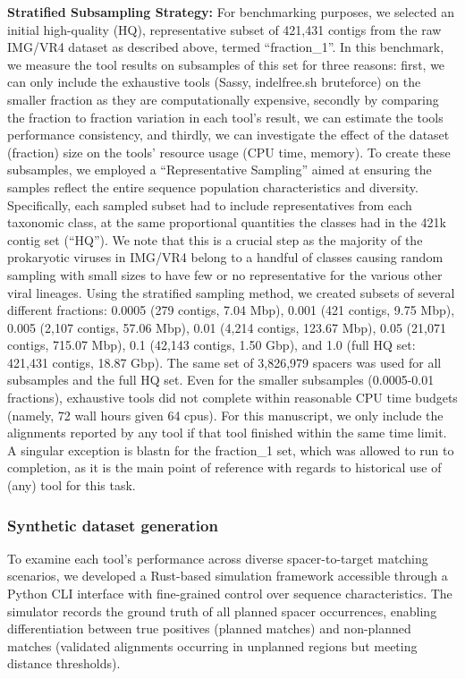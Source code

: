 \documentclass[
]{article}
\begin{document}
\textbf{Stratified Subsampling Strategy:} For benchmarking purposes, we
selected an initial high-quality (HQ), representative subset of 421,431
contigs from the raw IMG/VR4 dataset as described above, termed
``fraction\_1''. In this benchmark, we measure the tool results on
subsamples of this set for three reasons: first, we can only include the
exhaustive tools (Sassy, indelfree.sh bruteforce) on the smaller
fraction as they are computationally expensive, secondly by comparing
the fraction to fraction variation in each tool's result, we can
estimate the tools performance consistency, and thirdly, we can
investigate the effect of the dataset (fraction) size on the tools'
resource usage (CPU time, memory). To create these subsamples, we
employed a ``Representative Sampling'' aimed at ensuring the samples
reflect the entire sequence population characteristics and diversity.
Specifically, each sampled subset had to include representatives from
each taxonomic class, at the same proportional quantities the classes
had in the 421k contig set (``HQ''). We note that this is a crucial step
as the majority of the prokaryotic viruses in IMG/VR4 belong to a
handful of classes causing random sampling with small sizes to have few
or no representative for the various other viral lineages. Using the
stratified sampling method, we created subsets of several different
fractions: 0.0005 (279 contigs, 7.04 Mbp), 0.001 (421 contigs, 9.75
Mbp), 0.005 (2,107 contigs, 57.06 Mbp), 0.01 (4,214 contigs, 123.67
Mbp), 0.05 (21,071 contigs, 715.07 Mbp), 0.1 (42,143 contigs, 1.50 Gbp),
and 1.0 (full HQ set: 421,431 contigs, 18.87 Gbp). The same set of
3,826,979 spacers was used for all subsamples and the full HQ set. Even
for the smaller subsamples (0.0005-0.01 fractions), exhaustive tools did
not complete within reasonable CPU time budgets (namely, 72 wall hours
given 64 cpus). For this manuscript, we only include the alignments
reported by any tool if that tool finished within the same time limit. A
singular exception is blastn for the fraction\_1 set, which was allowed
to run to completion, as it is the main point of reference with regards
to historical use of (any) tool for this task.

\subsubsection{Synthetic dataset generation}\label{sec-synthetic-data}

To examine each tool's performance across diverse spacer-to-target
matching scenarios, we developed a Rust-based simulation framework
accessible through a Python CLI interface with fine-grained control over
sequence characteristics. The simulator records the ground truth of all
planned spacer occurrences, enabling differentiation between true
positives (planned matches) and non-planned matches (validated
alignments occurring in unplanned regions but meeting distance
thresholds).
\end{document}
